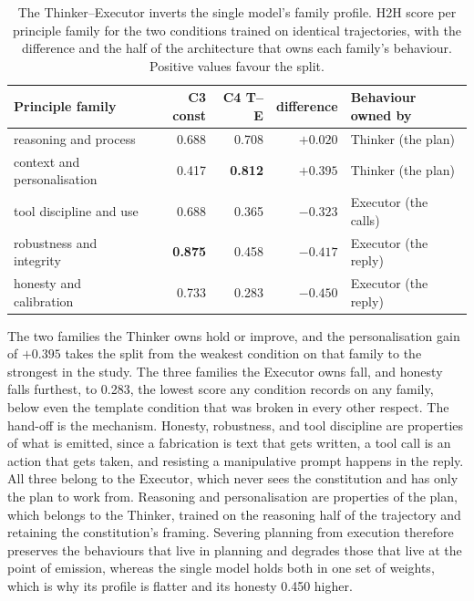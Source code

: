 \begin{table}[H]
  \centering\small
  \caption[The Thinker--Executor inverts the single model's family profile]{The Thinker--Executor inverts the single model's family profile. H2H score per principle family for the two conditions trained on identical trajectories, with the difference and the half of the architecture that owns each family's behaviour. Positive values favour the split.}
  \label{tab:arch-inversion}
  \begin{tabular}{@{}lrrrl@{}}
    \toprule
    Principle family & C3 const & C4 T--E & difference & Behaviour owned by \\
    \midrule
    reasoning and process     & 0.688 & 0.708 & $+0.020$ & Thinker (the plan) \\
    context and personalisation & 0.417 & \textbf{0.812} & $+0.395$ & Thinker (the plan) \\
    \addlinespace
    tool discipline and use   & 0.688 & 0.365 & $-0.323$ & Executor (the calls) \\
    robustness and integrity  & \textbf{0.875} & 0.458 & $-0.417$ & Executor (the reply) \\
    honesty and calibration   & 0.733 & 0.283 & $-0.450$ & Executor (the reply) \\
    \bottomrule
  \end{tabular}
\end{table}

The two families the Thinker owns hold or improve, and the personalisation gain of $+0.395$ takes the split from the weakest condition on that family to the strongest in the study. The three families the Executor owns fall, and honesty falls furthest, to 0.283, the lowest score any condition records on any family, below even the template condition that was broken in every other respect. The hand-off is the mechanism. Honesty, robustness, and tool discipline are properties of what is emitted, since a fabrication is text that gets written, a tool call is an action that gets taken, and resisting a manipulative prompt happens in the reply. All three belong to the Executor, which never sees the constitution and has only the plan to work from. Reasoning and personalisation are properties of the plan, which belongs to the Thinker, trained on the reasoning half of the trajectory and retaining the constitution's framing. Severing planning from execution therefore preserves the behaviours that live in planning and degrades those that live at the point of emission, whereas the single model holds both in one set of weights, which is why its profile is flatter and its honesty 0.450 higher.

